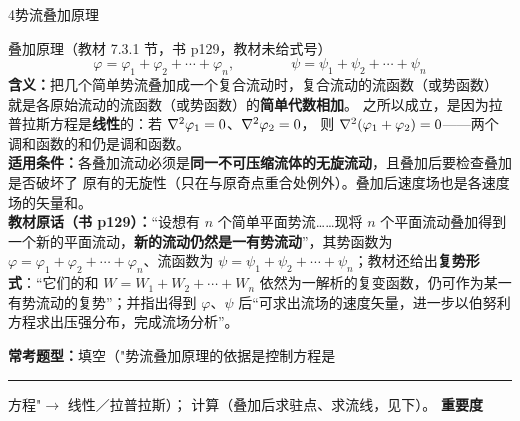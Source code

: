 \begin{kaodian}{4}{势流叠加原理}
\begin{gongshi}{叠加原理（教材 7.3.1 节，书 p129，教材未给式号）}
\[ \varphi=\varphi_1+\varphi_2+\cdots+\varphi_n,\qquad\qquad \psi=\psi_1+\psi_2+\cdots+\psi_n \]
\textbf{含义：}把几个简单势流叠加成一个复合流动时，复合流动的流函数（或势函数）
就是各原始流动的流函数（或势函数）的\textbf{简单代数相加}。
之所以成立，是因为拉普拉斯方程是\textbf{线性}的：若 $\nabla^2\varphi_1=0$、$\nabla^2\varphi_2=0$，
则 $\nabla^2(\varphi_1+\varphi_2)=0$——两个调和函数的和仍是调和函数。\\
\textbf{适用条件：}各叠加流动必须是\textbf{同一不可压缩流体的无旋流动}，且叠加后要检查叠加是否破坏了
原有的无旋性（只在与原奇点重合处例外）。叠加后速度场也是各速度场的矢量和。\\
\textbf{教材原话（书 p129）：}“设想有 $n$ 个简单平面势流……现将 $n$ 个平面流动叠加得到一个新的平面流动，\textbf{新的流动仍然是一有势流动}”，其势函数为 $\varphi=\varphi_1+\varphi_2+\cdots+\varphi_n$、流函数为 $\psi=\psi_1+\psi_2+\cdots+\psi_n$；教材还给出\textbf{复势形式}：“它们的和 $W=W_1+W_2+\cdots+W_n$ 依然为一解析的复变函数，仍可作为某一有势流动的复势”；并指出得到 $\varphi$、$\psi$ 后“可求出流场的速度矢量，进一步以伯努利方程求出压强分布，完成流场分析”。
\end{gongshi}
\textbf{常考题型：}填空（"势流叠加原理的依据是控制方程是\rule{1.6cm}{0.4pt}方程"$\to$ 线性／拉普拉斯）；
计算（叠加后求驻点、求流线，见下）。
\textbf{重要度 }\quad{}\quad{}
\end{kaodian}

